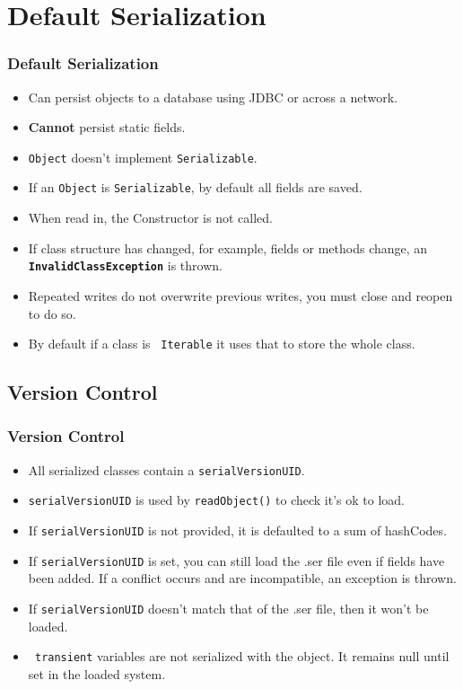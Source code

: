\documentclass{beamer}
\begin{document}
\section{Default Serialization}
\begin{frame}
\frametitle{Default Serialization}
\begin{itemize}
\item Can persist objects to a database using JDBC or across a network.
\item \textbf{Cannot} persist {\color{red} static} fields.
\item \texttt{Object} doesn't implement \texttt{Serializable}.
\item If an \texttt{Object} is \texttt{Serializable}, by default all fields are saved.
\item When read in, the Constructor is not called.
\item If class structure has changed, for example, fields or methods change, an \textbf{\texttt{InvalidClassException}} is thrown.
\item Repeated writes do not overwrite previous writes, you must close and reopen to do so.
\item By default if a class is \texttt{\color{green} Iterable} it uses that to store the whole class.
\end{itemize}
\end{frame}

\subsection{Version Control}
\begin{frame}
\frametitle{Version Control}
\begin{itemize}
\item All serialized classes contain a \texttt{serialVersionUID}.
\item \texttt{serialVersionUID} is used by \texttt{readObject()} to check it's ok to load. 
\item If \texttt{serialVersionUID} is not provided, it is defaulted to a sum of hashCodes.
\item If \texttt{serialVersionUID} is set, you can still load the .ser file even if fields have been added. If a conflict occurs and are incompatible, an exception is thrown.
\item If \texttt{serialVersionUID} doesn't match that of the .ser file, then it won't be loaded.
\item \texttt{{\color{red} transient}} variables are not serialized with the object. It remains null until set in the loaded system.
\end{itemize}
\end{frame}
\end{document}
